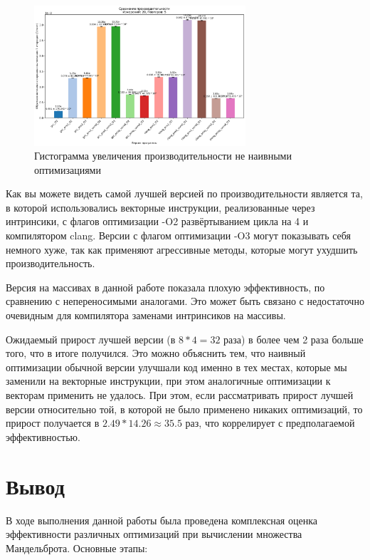 \documentclass[12pt,a4paper]{article}
\begin{document}
\begin{figure}[ht!]
    \centering
    \includegraphics[width=0.7\textwidth]{histogram1.png}
    \caption{Гистограмма увеличения производительности не наивными оптимизациями}
    \label{fig:histogram1}
\end{figure}

Как вы можете видеть самой лучшей версией по производительности является та, в которой использовались векторные инструкции, реализованные через интринсики, с флагов оптимизации -O2 развёртыванием цикла на 4 и компилятором clang. Версии с флагом оптимизации -O3 могут показывать себя немного хуже, так как применяют агрессивные методы, которые могут ухудшить производительность.

Версия на массивах в данной работе показала плохую эффективность, по сравнению с непереносимыми аналогами. Это может быть связано с недостаточно очевидным для компилятора заменами интринсиков на массивы.

Ожидаемый прирост лучшей версии (в $8*4=32$ раза) в более чем 2 раза  больше того, что в итоге получился. Это можно объяснить тем, что наивный оптимизации обычной версии улучшали код именно в тех местах, которые мы заменили на векторные инструкции, при этом аналогичные оптимизации к векторам применить не удалось. При этом, если рассматривать прирост лучшей версии относительно той, в которой не было применено никаких оптимизаций, то прирост получается в $2.49*14.26\approx35.5$ раз, что коррелирует с предполагаемой эффективностью.

\section{Вывод}

В ходе выполнения данной работы была проведена комплексная оценка эффективности различных оптимизаций при вычислении множества Мандельброта. Основные этапы:
\end{document}
